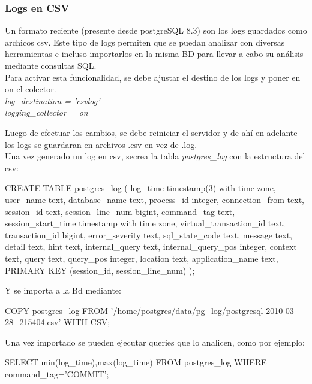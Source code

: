 \subsubsection{Logs en CSV}

Un formato reciente (presente desde postgreSQL 8.3) son los logs guardados como archicos csv. Este tipo de logs permiten que se puedan analizar con diversas herramientas e incluso importarlos en la misma BD para llevar a cabo su análisis mediante consultas SQL.\\

Para activar esta funcionalidad, se debe ajustar el destino de los logs y poner en on el colector.\\

\textit{log\_destination = 'csvlog'\\ 
logging\_collector = on\\}

Luego de efectuar los cambios, se debe reiniciar el servidor y de ahí en adelante los logs se guardaran en archivos .csv en vez de .log.\\

Una vez generado un log en csv, secrea la tabla \textit{postgres\_log} con la estructura del csv:\\

\begin{pyglist}
CREATE TABLE postgres_log
(
log_time timestamp(3) with time zone,
user_name text,
database_name text,
process_id integer,
connection_from text,
session_id text,
session_line_num bigint,
command_tag text,
session_start_time timestamp with time zone,
virtual_transaction_id text,
transaction_id bigint,
error_severity text,
sql_state_code text,
message text,
detail text,
hint text,
internal_query text,
internal_query_pos integer,
context text,
query text,
query_pos integer,
location text,
application_name text,
PRIMARY KEY (session_id, session_line_num)
);
\end{pyglist}

Y se importa a la Bd mediante:\\

\begin{pyglist}
COPY postgres_log FROM 
'/home/postgres/data/pg_log/postgresql-2010-03-28_215404.csv' WITH CSV;
\end{pyglist}

Una vez importado se pueden ejecutar queries que lo analicen, como por ejemplo:\\

\begin{pyglist}
SELECT min(log_time),max(log_time) FROM postgres_log WHERE command_tag='COMMIT';
\end{pyglist}

